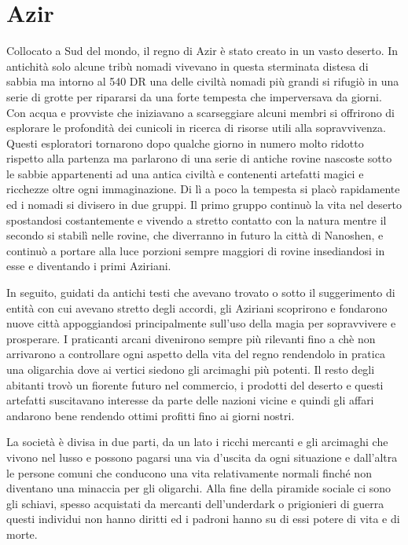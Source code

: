 \documentclass[letterpaper,twocolumn,openany,nodeprecatedcode]{dndbook}
\begin{document}
\section{Azir}
Collocato a Sud del mondo, il regno di Azir è stato creato in un vasto deserto. In antichità solo alcune tribù nomadi vivevano in questa sterminata distesa di sabbia ma intorno al 540 DR una delle civiltà nomadi più grandi si rifugiò in una serie di grotte per ripararsi da una forte tempesta che imperversava da giorni. Con acqua e provviste che iniziavano a scarseggiare alcuni membri si offrirono di esplorare le profondità dei cunicoli in ricerca di risorse utili alla sopravvivenza. Questi esploratori tornarono dopo qualche giorno in numero molto ridotto rispetto alla partenza ma parlarono di una serie di antiche rovine nascoste sotto le sabbie appartenenti ad una antica civiltà e contenenti artefatti magici e ricchezze oltre ogni immaginazione. Di lì a poco la tempesta si placò rapidamente ed i nomadi si divisero in due gruppi. Il primo gruppo continuò la vita nel deserto spostandosi costantemente e vivendo a stretto contatto con la natura mentre il secondo si stabilì nelle rovine, che diverranno in futuro la città di Nanoshen, e continuò a portare alla luce porzioni sempre maggiori di rovine insediandosi in esse e diventando i primi Aziriani.

In seguito, guidati da antichi testi che avevano trovato o sotto il suggerimento di entità con cui avevano stretto degli accordi, gli Aziriani scoprirono e fondarono nuove città appoggiandosi principalmente sull'uso della magia per sopravvivere e prosperare. I praticanti arcani divenirono sempre più rilevanti fino a chè non arrivarono a controllare ogni aspetto della vita del regno rendendolo in pratica una oligarchia dove ai vertici siedono gli arcimaghi più potenti. Il resto degli abitanti trovò un fiorente futuro nel commercio, i prodotti del deserto e questi artefatti suscitavano interesse da parte delle nazioni vicine e quindi gli affari andarono bene rendendo ottimi profitti fino ai giorni nostri.

La società è divisa in due parti, da un lato i ricchi mercanti e gli arcimaghi che vivono nel lusso e possono pagarsi una via d'uscita da ogni situazione e dall'altra le persone comuni che conducono una vita relativamente normali finché non diventano una minaccia per gli oligarchi. Alla fine della piramide sociale ci sono gli schiavi, spesso acquistati da mercanti dell'underdark o prigionieri di guerra questi individui non hanno diritti ed i padroni hanno su di essi potere di vita e di morte.
\end{document}
